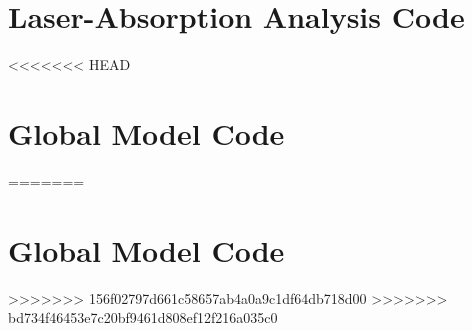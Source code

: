 \documentclass[12pt]{./tex/thesis-umich}
\begin{document}
    \chapter{Laser-Absorption Analysis Code}
<<<<<<< HEAD
      

    \chapter{Global Model Code}
      
=======

    \chapter{Global Model Code}
>>>>>>> 156f02797d661c58657ab4a0a9c1df64db718d00
>>>>>>> bd734f46453e7c20bf9461d808ef12f216a035c0

  
  
\end{document}

